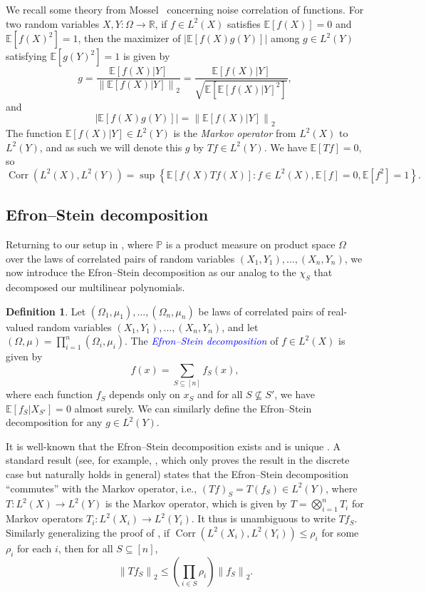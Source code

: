 \documentclass[12pt,letterpaper]{amsart}
\newcommand{\dfn}[1]{\textcolor{blue}{\emph{#1}}}
\def\E{\mathbb{E}}
\def\P{\mathbb{P}}
\def\R{\mathbb{R}}
\def\Corr{\operatorname{Corr}}
\newcommand{\norm}[1]{\left\lVert#1\right\rVert}
\newcommand{\abs}[1]{\left\lvert#1\right\rvert}
\newcommand{\set}[1]{\left\{#1\right\}}
\newcommand{\paren}[1]{\left(#1\right)}
\newcommand{\1}[1]{1_{\left\{#1\right\}}}
\theoremstyle{definition}
\newtheorem{definition}[theorem]{Definition}
\theoremstyle{remark}
\begin{document}
We recall some theory from Mossel~\cite[\S 2.2]{Mossel_Gaussian} concerning noise correlation of functions.
For two random variables $X,Y:\Omega\to\R$, if $f\in L^2(X)$ satisfies $\E[f(X)]=0$ and $\E[f(X)^2]=1$, then the maximizer of $\abs{\E[f(X)g(Y)]}$ among $g\in L^2(Y)$ satisfying $\E[g(Y)^2]=1$ is given by 
\[ g=\frac{\E[f(X)|Y]}{\norm{\E[f(X)|Y]}_2} = \frac{\E[f(X)|Y]}{\sqrt{\E[\E[f(X)|Y]^2]}}, \]
and
\[ \abs{\E[f(X)g(Y)]} = \norm{\E[f(X)|Y]}_2\]
The function $\E[f(X)|Y]\in L^2(Y)$ is the \emph{Markov operator} from $L^2(X)$ to $L^2(Y)$, and as such we will denote this $g$ by $Tf\in L^2(Y)$.
We have $\E[Tf]=0$, so
\begin{equation}\label{eq:correlation_using_Markov}
    \Corr(L^2(X),L^2(Y)) = \sup\set{\E[f(X)Tf(X)]: f\in L^2(X),\E[f]=0,\E[f^2]=1}.
\end{equation}
\subsection{Efron--Stein decomposition}\label{subsec:Efron_Stein}
Returning to our setup in , where $\P$ is a product measure on product space $\Omega$ over the laws of correlated pairs of random variables $(X_1,Y_1),\dots,(X_n,Y_n)$, we now introduce the Efron--Stein decomposition as our analog to the $\chi_S$ that decomposed our multilinear polynomials.
\begin{definition}
    Let $(\Omega_1,\mu_1),\dots,(\Omega_n,\mu_n)$ be laws of correlated pairs of real-valued random variables $(X_1,Y_1),\dots,(X_n,Y_n)$, and let $(\Omega,\mu)=\prod_{i=1}^n(\Omega_i,\mu_i)$.
    The \dfn{Efron--Stein decomposition} of $f\in L^2(X)$ is given by
    \[ f(x) = \sum_{S\subseteq[n]}f_S(x), \]
    where each function $f_S$ depends only on $x_S$ and for all $S\not\subseteq S'$, we have $\E[f_S|X_{S'}]=0$ almost surely.
    We can similarly define the Efron--Stein decomposition for any $g\in L^2(Y)$.
\end{definition}
It is well-known that the Efron--Stein decomposition exists and is unique \cite{EfronStein:81}.
A standard result (see, for example, \cite[Proposition 2.11]{Mossel_Gaussian}, which only proves the result in the discrete case but naturally holds in general) states that the Efron--Stein decomposition ``commutes'' with the Markov operator, i.e., $(Tf)_S = T(f_S)\in L^2(Y)$, where $T:L^2(X)\to L^2(Y)$ is the Markov operator, which is given by $T=\bigotimes_{i=1}^n T_i$ for Markov operators $T_i:L^2(X_i)\to L^2(Y_i)$.
It thus is unambiguous to write $Tf_S$.
Similarly generalizing the proof of \cite[Proposition 2.12]{Mossel_Gaussian}, if $\Corr(L^2(X_i),L^2(Y_i))\leq\rho_i$ for some $\rho_i$ for each $i$, then for all $S\subseteq[n]$,
\begin{equation}\label{eq:Markov_operator_correlation_bound}
    \norm{Tf_S}_2 \leq \paren{\prod_{i\in S}\rho_i}\norm{f_S}_2.
\end{equation}
\end{document}
